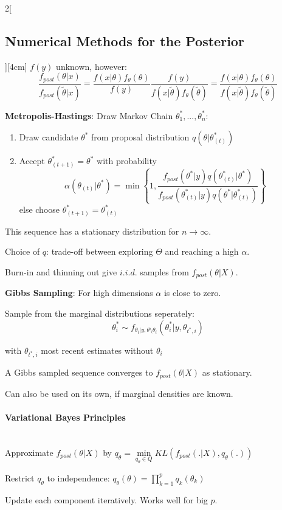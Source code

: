 \documentclass[8pt]{extarticle}
\begin{document}
\begin{multicols}{2}[\subsection{Numerical Methods for the Posterior}][4cm]
$f(y)$ unknown, however: $$\frac{f_{post}(\theta|x)}{f_{post}(\tilde{\theta}|x)} = \frac{f(x|\theta)f_\theta(\theta)}{f(y)} \frac{f(y)}{f(x|\tilde{\theta})f_\theta(\tilde{\theta})}= \frac{f(x|\theta)f_\theta(\theta)}{f(x|\tilde{\theta})f_\theta(\tilde{\theta})}$$

\vspace{0.5em}
 \textbf{Metropolis-Hastings}: Draw Markov Chain $\theta_1^*, ..., \theta_n^*$:
\begin{enumerate}
\item Draw candidate $\theta^*$ from proposal distribution $q\left(\theta|\theta_{(t)}^*\right)$
\item Accept $\theta^*_{(t+1)} = \theta^*$ with probability $$\alpha(\theta_{(t)}|\theta^*) = \min\left\{1,\frac{f_{post}\left(\theta^*|y\right)q\left(\theta_{(t)}^*|\theta^*\right)}{f_{post}\left(\theta_{(t)}^*|y\right)q\left(\theta^*|\theta_{(t)}^*\right)}\right\}$$
else choose $\theta^*_{(t+1)} = \theta_{(t)}^*$
\end{enumerate}
This sequence has a stationary distribution for $n\rightarrow \infty$.

\noindent Choice of $q$: trade-off between exploring $\Theta$ and reaching a high $\alpha$.

\noindent Burn-in and thinning out give $i.i.d.$ samples from $f_{post}(\theta|X)$.

\textbf{Gibbs Sampling}: For high dimensions $\alpha$ is close to zero.

Sample from the marginal distributions seperately:
 $$\theta_i^* \sim f_{\theta_i | y, \theta \setminus \theta_i}\left(\theta_i^*|y, \theta_{t^*,i}\right)$$ 
 
 with $\theta_{t^*, i}$ most recent estimates without $\theta_i$
 
 \noindent A Gibbs sampled sequence converges to $f_{post}(\theta|X)$ as stationary.
 
 \noindent Can also be used on its own, if marginal densities are known.


\paragraph{Variational Bayes Principles}  \ \\

Approximate $f_{post}(\theta|X)$ by $q_\theta=\underset{q_\theta\in Q}{\min} KL(f_{post}(.|X), q_\theta(.))$

Restrict $q_\theta$ to independence: $q_\theta(\theta) = \prod_{k=1}^p q_k(\theta_k)$

Update each component iteratively.
Works well for big $p$. 
\end{multicols}
\end{document}
